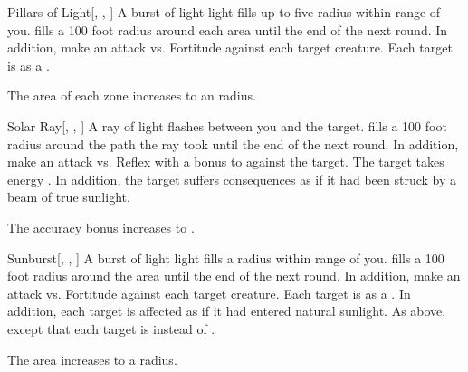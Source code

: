 \lowercase{\hypertarget{spell:Pillars of Light}{}}\label{spell:Pillars of Light}
\begin{freeability}[Rank 5]{\hypertarget{spell:Pillars of Light}{Pillars of Light}}[, , ]
A burst of light light fills up to five \areasmall radius  within \rnglong range of you.
 fills a 100 foot radius around each area until the end of the next round.
In addition, make an attack vs. Fortitude against each target creature.
\hit Each target is \dazzled as a .

\rankline
{} The area of each zone increases to an  radius.

\end{freeability}
\vspace{0.25em}



\lowercase{\hypertarget{spell:Solar Ray}{}}\label{spell:Solar Ray}
\begin{freeability}[Rank 5]{\hypertarget{spell:Solar Ray}{Solar Ray}}[, , ]
A ray of light flashes between you and the target.
 fills a 100 foot radius around the path the ray took until the end of the next round.
In addition, make an attack vs. Reflex with a  bonus to  against the target.
\hit The target takes energy .
In addition, the target suffers consequences as if it had been struck by a beam of true sunlight.

\rankline
{} The accuracy bonus increases to .

\end{freeability}
\vspace{0.25em}



\lowercase{\hypertarget{spell:Sunburst}{}}\label{spell:Sunburst}
\begin{freeability}[Rank 5]{\hypertarget{spell:Sunburst}{Sunburst}}[, , ]
A burst of light light fills a \areamed radius  within \rngmed range of you.
 fills a 100 foot radius around the area until the end of the next round.
In addition, make an attack vs. Fortitude against each target creature.
\hit Each target is  as a .
In addition, each target is affected as if it had entered natural sunlight.
\crit As above, except that each target is  instead of .

\rankline
{} The area increases to a \arealarge radius.

\end{freeability}
\vspace{0.25em}



